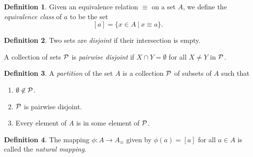 \documentclass[12pt]{article}
\newcommand{\enumarabic}[1]{
	\begin{enumerate}[label=\textbf{\arabic*.}]
		#1
	\end{enumerate}
}
\theoremstyle{definition}
\newtheorem*{defn}{Definition}
\begin{document}
\begin{defn}
Given an equivalence relation $\equiv$ on a set $A$, we define the \emph{equivalence class} of $a$ to be the set
\[[a]=\{x\in A\ |\ x\equiv a\}.\]
\end{defn}
\begin{defn}
	Two sets are \emph{disjoint} if their intersection is empty.
	
	A collection of sets $\cal P$ is \emph{pairwise disjoint} if $X\cap Y=\emptyset$ for all $X\neq Y$ in $\cal P$.
\end{defn}
\begin{defn}
	A \emph{partition} of the set $A$ is a collection $\cal P$ of subsets of $A$ such that
	\enumarabic{
		\item $\emptyset\not\in\cal P$.
		\item $\cal P$ is pairwise disjoint.
		\item Every element of $A$ is in some element of $\cal P$.
	}
\end{defn}
\begin{defn}
	The mapping $\phi:A\to A_{\equiv}$ given by $\phi(a)=[a]$ for all $a\in A$ is called the \emph{natural mapping}.
\end{defn}
\end{document}
